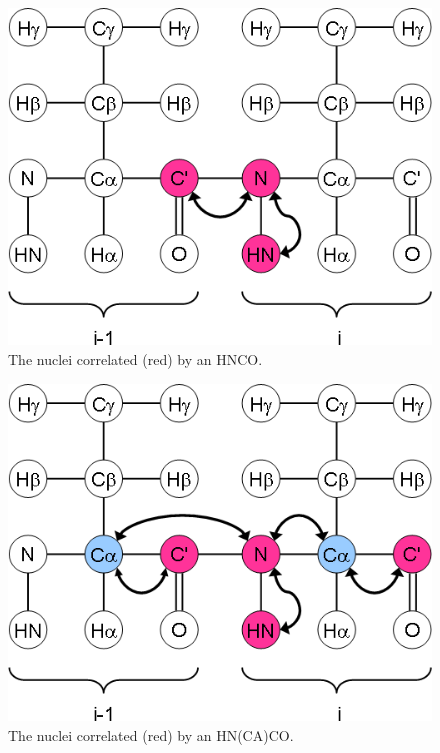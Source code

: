\begin{figure}
  \includegraphics[scale=0.75]{figures/ccpn_hnco}
  \caption[The nuclei correlated by an HNCO.]
          {The nuclei correlated (red) by an HNCO.}
  \label{ccpn_hnco}
\end{figure}

\begin{figure}
  \includegraphics[scale=0.75]{figures/ccpn_hncaco}
  \caption[The nuclei correlated by an HN(CA)CO.]
          {The nuclei correlated (red) by an HN(CA)CO.}
  \label{ccpn_hncaco}
\end{figure}

